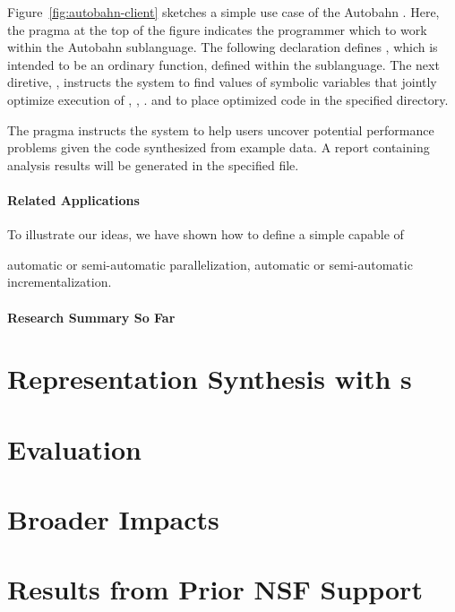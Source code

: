 Figure~\ref{fig:autobahn-client} sketches a simple use case of the Autobahn \rasp.
Here, the pragma at the top of the figure indicates the programmer which to work
within the Autobahn sublanguage.  The following declaration defines ,
which is intended to be an ordinary function, defined within the \rasp{} sublanguage.
The next diretive, , instructs the system to find values of symbolic
variables that jointly optimize execution of , , \etc.  
and to place optimized code in the specified directory.

The  pragma instructs the system to help users uncover potential
performance problems given the code synthesized from example data.  A report containing
analysis results will be
generated in the specified file.

\paragraph*{Related Applications}
To illustrate our ideas, we have shown how to define a simple \rasp capable of

automatic or semi-automatic parallelization, automatic or semi-automatic incrementalization.

\paragraph*{Research Summary So Far}



\section{Representation Synthesis with \rasp{}s}
\label{sec:eval}

\section{Evaluation}
\label{sec:eval}


\section{Broader Impacts}
\label{sec:impact}


\section{Results from Prior NSF Support}
\label{sec:prior-support}

